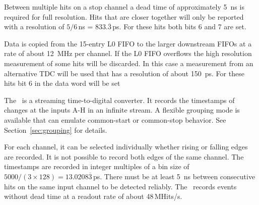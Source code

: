 {    Between multiple hits on a stop channel a dead time of approximately
    \SI{5}{\nano\second} is required for full resolution.  Hits that are
    closer together will only be reported with a resolution of
    $5/6$\,ns = $833.\overline{3}$\,ps. For these
    hits both bits 6 and 7 are set.

    Data is copied from the 15-entry L0 FIFO to the larger downstream FIFOs at
    a rate of about \SI{12}{\mega\hertz} per channel.  If the L0 FIFO
    overflows the high resolution measurement of some hits will be discarded. 
    In this case a measurement from an alternative TDC will be used that has a
    resolution of about \SI{150}{\pico\second}.  For these hits bit 6 in the
    data word will be set
} { %
    The \deviceName\ is a streaming time-to-digital converter. It records the
    timestamps of changes at the inputs A-H in an infinite stream.  A flexible
    grouping mode is available that can emulate common-start or common-stop
    behavior. See Section~\ref{sec:grouping} for details.

    For each channel, it can be selected individually whether rising or
    falling edges are recorded. It is not possible to record both edges of the
    same channel.  The timestamps are recorded in integer multiples of a bin
    size of $5000/(3\times 128) = 13.0208\overline{3}$\,ps. 
    There must be at least \SI{5}{\nano\second} between consecutive hits on
    the same input channel to be detected reliably.  The \deviceName\ records
    events without dead time at a readout rate of about 48\,MHits/s.
}
